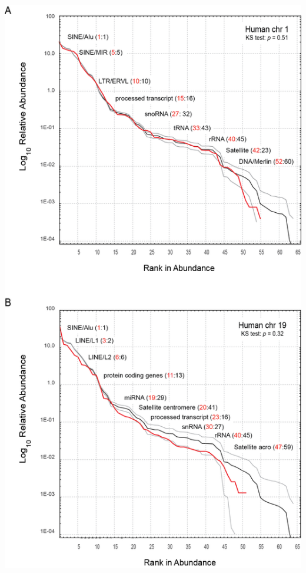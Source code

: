 \begin{FPfigure}
\centering 
\includegraphics[height=\textheight]{tex_source/figures/untb_genomes/ra_chroms.png}

\end{FPfigure}
